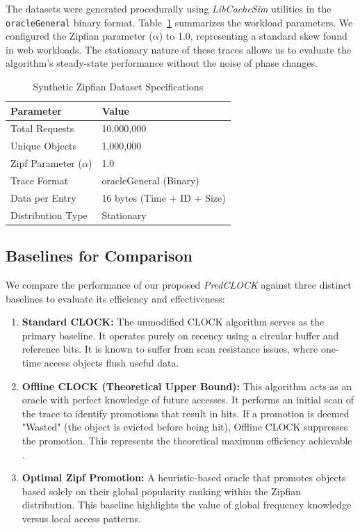 The datasets were generated procedurally using \textit{LibCacheSim}
utilities in the \texttt{oracleGeneral} binary format.
Table~\ref{tab:dataset_specs} summarizes the workload parameters. We
configured the Zipfian parameter ($\alpha$) to 1.0, representing a
standard skew found in web workloads. The stationary nature of these
traces allows us to evaluate the algorithm's steady-state performance
without the noise of phase changes.

\begin{table}[t]
  \caption{Synthetic Zipfian Dataset Specifications}
  \label{tab:dataset_specs}
  \centering
  \begin{tabular}{|l|l|}
    \hline
    \textbf{Parameter} & \textbf{Value} \\
    \hline
    Total Requests & 10,000,000 \\
    \hline
    Unique Objects & 1,000,000 \\
    \hline
    Zipf Parameter ($\alpha$) & 1.0 \\
    \hline
    Trace Format & oracleGeneral (Binary) \\
    \hline
    Data per Entry & 16 bytes (Time + ID + Size) \\
    \hline
    Distribution Type & Stationary \\
    \hline
  \end{tabular}
\end{table}

\subsection{Baselines for Comparison}
We compare the performance of our proposed \textit{PredCLOCK} against
three distinct baselines to evaluate its efficiency and effectiveness:

\begin{enumerate}
  \item \textbf{Standard CLOCK:} The unmodified CLOCK algorithm
    serves as the primary baseline. It operates purely on recency
    using a circular buffer and reference bits. It is known to suffer
    from scan resistance issues, where one-time access objects flush
    useful data.
  \item \textbf{Offline CLOCK (Theoretical Upper Bound):} This
    algorithm acts as an oracle with perfect knowledge of future
    accesses. It performs an initial scan of the trace to identify
    promotions that result in hits. If a promotion is deemed "Wasted"
    (the object is evicted before being hit), Offline CLOCK
    suppresses the promotion. This represents the theoretical maximum
    efficiency achievable \cite{Belady1966A}.
  \item \textbf{Optimal Zipf Promotion:} A heuristic-based oracle
    that promotes objects based solely on their global popularity
    ranking within the Zipfian distribution. This baseline highlights
    the value of global frequency knowledge versus local access patterns.
\end{enumerate}

